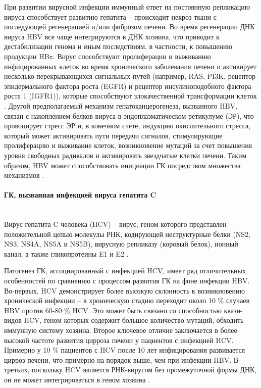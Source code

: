 При развитии вирусной инфекции иммунный ответ на постоянную репликацию вируса способствует развитию гепатита – происходит некроз ткани с последующей регенерацией и/или фиброзом печени. Во время регенерации ДНК вируса HBV все чаще интегрируются в ДНК хозяина, что приводит к дестабилизации генома и иным последствиям, в частности, к повышению продукции HBx. Вирус способствуют пролиферации и выживанию инфицированных клеток во время хронического заболевания печени и активирует несколько перекрывающихся сигнальных путей (например, RAS, PI3K, рецептор эпидермального фактора роста (EGFR) и рецептор инсулиноподобного фактора роста 1 (IGFR1)), которые способствуют злокачественной трансформации клеток \cite{arzumanyan_pathogenic_2013}. Другой предполагаемый механизм гепатоканцерогенеза, вызванного HBV,  связан с накоплением белков вируса в эндоплазматическом ретикулуме (ЭР), что провоцирует стресс ЭР \cite{choi_naturally_2019} и, в конечном счете, индукцию окислительного стресса, который может активировать пути передачи сигналов, стимулирующие пролиферацию и выживание клеток, возникновение мутаций за счет повышения уровня свободных радикалов и активировать звездчатые клетки печени. Таким образом, HBV может способствовать инициации ГК посредством множества механизмов \cite{farazi_hepatocellular_2006}.

\paragraph{ГК, вызванная инфекцией вируса гепатита C}\mbox{}\\

Вирус гепатита C человека (HCV) – вирус, геном которого представлен положительной цепью молекулы РНК, кодирующей неструктурные белки (NS2, NS3, NS4A, NS5A и NS5B), вирусную репликазу (коровый белок), ионный канал, а также гликопротеины E1 и E2 \cite{arzumanyan_pathogenic_2013}.

Патогенез ГК, ассоциированный с инфекцией HCV, имеет ряд отличительных особенностей по сравнению с процессом развития ГК на фоне инфекции HBV. Во-первых, HCV демонстрирует более высокую склонность к возникновению хронической инфекции – в хроническую стадию переходит около 10 \% случаев HBV против 60-80 \% HCV. Это может быть связано со способностью квази-видов HCV, геном которых содержит большое количество мутаций, обходить иммунную систему хозяина. Второе ключевое отличие заключается в более высокой частоте развития цирроза печени у пациентов с инфекцией HCV. Примерно у 10 \% пациентов с HCV после 10 лет инфицирования развивается цирроз печени, что примерно на порядок выше, чем при инфекции HBV. В-третьих, поскольку HCV является РНК-вирусом без промежуточной формы ДНК, он не может интегрироваться в геном хозяина \cite{farazi_hepatocellular_2006}.

